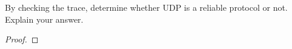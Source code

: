 \documentclass[../../main.tex]{subfiles}
\begin{document}
\begin{wts}
By checking the trace, determine whether UDP is a reliable protocol or not. Explain your answer.
\end{wts}
\begin{proof}

\end{proof}
\end{document}
